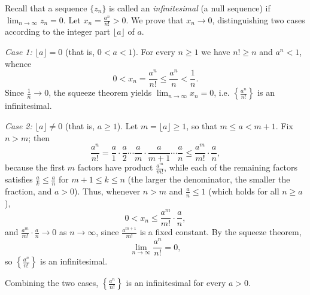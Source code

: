\documentclass[11pt,a4paper]{article}
\newenvironment{solution}[1]{%
  \par\addvspace{1.7ex}%
  \noindent{\color{solutioncolor}\textbf{#1}}\hspace{0.55em}\ignorespaces}%
  {\par\addvspace{0.9ex}}
\begin{document}
\begin{solution}{Solution 2.1.19}\label{es:2.1.19}
Recall that a sequence $\{z_{n}\}$ is called an \emph{infinitesimal} (a null
sequence) if $\lim_{n\to\infty}z_{n}=0$. Let $x_{n}=\frac{a^{n}}{n!}>0$. We prove
that $x_{n}\to 0$, distinguishing two cases according to the integer part
$\lfloor a\rfloor$ of $a$.

\emph{Case 1: $\lfloor a\rfloor=0$} (that is, $0<a<1$). For every $n\geq 1$ we have
$n!\geq n$ and $a^{n}<1$, whence
\[
0<x_{n}=\frac{a^{n}}{n!}\leq \frac{a^{n}}{n}<\frac1n .
\]
Since $\frac1n\to 0$, the squeeze theorem yields $\lim_{n\to\infty}x_{n}=0$, i.e.
$\left\{\frac{a^{n}}{n!}\right\}$ is an infinitesimal.

\emph{Case 2: $\lfloor a\rfloor\neq 0$} (that is, $a\geq 1$). Let
$m=\lfloor a\rfloor\geq 1$, so that $m\leq a<m+1$. Fix $n>m$; then
\[
\frac{a^{n}}{n!}
=\frac{a}{1}\cdot\frac{a}{2}\cdots\frac{a}{m}\cdot\frac{a}{m+1}\cdots\frac{a}{n}
\leq \frac{a^{m}}{m!}\cdot\frac{a}{n},
\]
because the first $m$ factors have product $\frac{a^{m}}{m!}$, while each of the
remaining factors satisfies $\frac{a}{k}\leq\frac{a}{n}$ for $m+1\leq k\leq n$
(the larger the denominator, the smaller the fraction, and $a>0$). Thus, whenever
$n>m$ and $\frac{a}{n}\leq 1$ (which holds for all $n\geq a$),
\[
0<x_{n}\leq \frac{a^{m}}{m!}\cdot\frac{a}{n},
\]
and $\frac{a^{m}}{m!}\cdot\frac{a}{n}\to 0$ as $n\to\infty$, since
$\frac{a^{m+1}}{m!}$ is a fixed constant. By the squeeze theorem,
\[
\lim_{n\to\infty}\frac{a^{n}}{n!}=0,
\]
so $\left\{\frac{a^{n}}{n!}\right\}$ is an infinitesimal.

Combining the two cases, $\left\{\frac{a^{n}}{n!}\right\}$ is an infinitesimal for
every $a>0$.
\end{solution}
\end{document}

